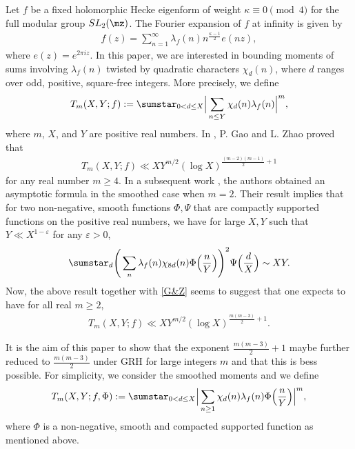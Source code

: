 \documentclass[twoside,leqno,10pt, A4]{amsart}
\begin{document}
Let $f$ be a fixed holomorphic Hecke eigenform of weight $\kappa\equiv 0 \pmod{4}$ for the full modular group $SL_2(\mz)$. The Fourier expansion of  $f$ at infinity is given by
\begin{align*}
f(z)=\sum_{n=1}^{\infty}\lambda_f(n)n^{\frac{\kappa-1}{2}}e(nz),
\end{align*}
where $e(z)=e^{2\pi iz}$.
 In this paper, we are interested in bounding moments of sums involving $\lambda_f (n)$ twisted by quadratic characters $\chi_{d}(n)$, where $d$ ranges over odd, positive, square-free integers.  More precisely, we define
\begin{align*}
 T_{m}(X,Y;f):=  \sumstar_{0<d \leq X }\Big | \sum_{n \leq Y}\chi_d(n)\lambda_f(n)\Big |^{m},
\end{align*}
 where $m$, $X$, and $Y$ are positive real numbers.
In \cite{G&Zhao24-12}, P. Gao and L. Zhao  proved that
\begin{align}\label{G&Z}
T_m(X,Y;f)\ll XY^{m/2}(\log X)^{\frac{(m-2)(m-1)}{2}+1}
\end{align}
for any real number $m\geq 4$.
In a subsequent work \cite{G&Zyt}, the authors \cite[Theorem 1.1]{G&Zyt} obtained an asymptotic formula in the smoothed case when $m=2$. Their result implies that
for two non-negative, smooth functions $\Phi, \Psi$ that are compactly supported functions on the positive real numbers, we have for large $X, Y$ such that $Y \ll X^{1-\varepsilon}$ for any $\varepsilon>0$,
\begin{align*}
    \sumstar_{d} \Bigg(\sum_{n} \lambda_f(n)\chi_{8d}(n)\Phi \Big(\frac nY \Big)\Bigg)^2 \Psi \Big(\frac d{X} \Big) \sim  XY.
\end{align*}
   Now, the above result together with \eqref{G&Z} seems to suggest that one expects to have for all real $m \geq 2$,
\begin{align*}
 T_{m}(X,Y;f)\ll XY^{m/2}(\log X)^{\frac {m(m-3)}{2}+1}.
\end{align*}

  It is the aim of this paper to show that the exponent $\frac {m(m-3)}{2}+1$ maybe further reduced to $\frac {m(m-3)}{2}$ under GRH for large integers $m$ and that this is bess possible. For simplicity, we consider the smoothed moments and we define
\begin{align*}
T_m(X,Y;f,\Phi):=\sumstar_{0<d\leq X}\Big|\sum_{n\geq 1}\chi_d(n)\lambda_f(n)\Phi\Big(\frac{n}{Y}\Big)\Big|^m,
 \end{align*}
where $\Phi$ is a non-negative, smooth and compacted supported function as mentioned above.
\end{document}
